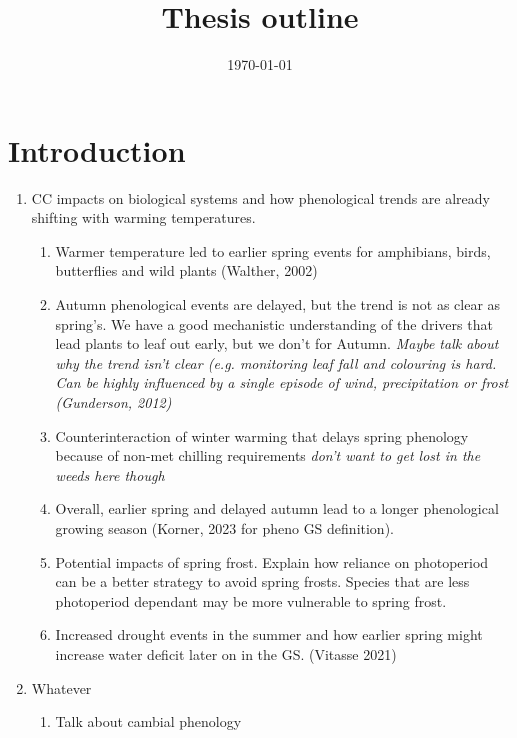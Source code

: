\documentclass{article}
\title{Thesis outline}
\date{\today}
\begin{document}

\maketitle
\section*{Introduction}



\begin{enumerate}

\item CC impacts on biological systems and how phenological trends are already shifting with warming temperatures. 

\begin{enumerate}
\item Warmer temperature led to earlier spring events for amphibians, birds, butterflies and wild plants (Walther, 2002)
\item Autumn phenological events are delayed, but the trend is not as clear as spring's. We have a good mechanistic understanding of the drivers that lead plants to leaf out early, but we don't for Autumn. \textit{Maybe talk about why the trend isn't clear (e.g. monitoring leaf fall and colouring is hard. Can be highly influenced by a single episode of wind, precipitation or frost (Gunderson, 2012)}  
\item Counterinteraction of winter warming that delays spring phenology because of non-met chilling requirements \textit{don't want to get lost in the weeds here though}
\item Overall, earlier spring and delayed autumn lead to a longer phenological growing season (Korner, 2023 for pheno GS definition).
\item Potential impacts of spring frost. Explain how reliance on photoperiod can be a better strategy to avoid spring frosts. Species that are less photoperiod dependant may be more vulnerable to spring frost.
\item Increased drought events in the summer and how earlier spring might increase water deficit later on in the GS. (Vitasse 2021)
\end{enumerate}

\item Whatever

\begin{enumerate}
\item Talk about cambial phenology
\end{enumerate}  %
\end{enumerate}

\end{document}
